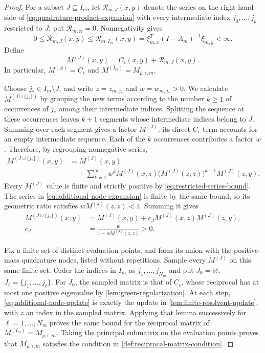 \begin{proof}
For a subset $J\subseteq I_m$, let $\mathcal R_{m,J}(x,y)$ denote
the series on the right-hand side of
\eqref{eq:quadrature-product-expansion} with every intermediate
index $j_0,\ldots,j_k$ restricted to $J$; put
$\mathcal R_{m,\varnothing}=0$. Nonnegativity gives
\begin{equation}\label{eq:restricted-series-bound}
 0\le\mathcal R_{m,J}(x,y)
 \le\mathcal R_{m,I_m}(x,y)
 =\xi_{m,x}^T(I-A_m)^{-1}\xi_{m,y}<\infty.
\end{equation}
Define
\[
 M^{(J)}(x,y)=C_\epsilon(x,y)+\mathcal R_{m,J}(x,y).
\]
In particular, $M^{(\varnothing)}=C_\epsilon$ and
$M^{(I_m)}=M_{\rho,\epsilon,m}$.

Choose $j_*\in I_m\setminus J$, and write
$z=z_{m,j_*}$ and $w=w_{m,j_*}>0$.
We calculate $M^{(J\cup\{j_*\})}$ by grouping the new terms
according to the number $k\ge1$ of occurrences of $j_*$ among
their intermediate indices. Splitting the sequence at these
occurrences leaves $k+1$ segments whose intermediate indices
belong to $J$. Summing over each segment gives a factor $M^{(J)}$;
its direct $C_\epsilon$ term accounts for an empty intermediate
sequence. Each of the $k$ occurrences contributes a factor $w$.
Therefore, by regrouping nonnegative series,
\begin{equation}\label{eq:additional-node-expansion}
 \begin{aligned}
 M^{(J\cup\{j_*\})}(x,y)
 &=M^{(J)}(x,y)\\
 &\quad+\sum_{k=1}^\infty w^k M^{(J)}(x,z)
       \bigl(M^{(J)}(z,z)\bigr)^{k-1}M^{(J)}(z,y).
 \end{aligned}
\end{equation}
Every $M^{(J)}$ value is finite and strictly positive by
\eqref{eq:restricted-series-bound}. The series in
\eqref{eq:additional-node-expansion} is finite by the same bound,
so its geometric ratio satisfies $wM^{(J)}(z,z)<1$.
Summing it gives
\begin{equation}\label{eq:additional-node-update}
 \begin{aligned}
 M^{(J\cup\{j_*\})}(x,y)
 &=M^{(J)}(x,y)+c_JM^{(J)}(x,z)M^{(J)}(z,y),\\
 c_J&=\frac{w}{1-wM^{(J)}(z,z)}>0.
 \end{aligned}
\end{equation}

Fix a finite set of distinct evaluation points, and form its union
with the positive-mass quadrature nodes, listed without repetitions.
Sample every $M^{(J)}$ on this same finite set. Order the indices
in $I_m$ as $j_1,\ldots,j_{N_m}$ and put
$J_0=\varnothing$, $J_\ell=\{j_1,\ldots,j_\ell\}$.
For $J_0$, the sampled matrix is that of $C_\epsilon$, whose
reciprocal has at most one positive eigenvalue by
\cref{lem:green-regularization}. At each step,
\eqref{eq:additional-node-update} is exactly the update in
\cref{lem:finite-resolvent-update}, with $z$ an index in the
sampled matrix. Applying that lemma successively for
$\ell=1,\ldots,N_m$ proves the same bound for the reciprocal
matrix of $M^{(I_m)}=M_{\rho,\epsilon,m}$.
Taking the principal submatrix on the evaluation points proves
that $M_{\rho,\epsilon,m}$ satisfies the condition in
\cref{def:reciprocal-matrix-condition}.


\end{proof}
